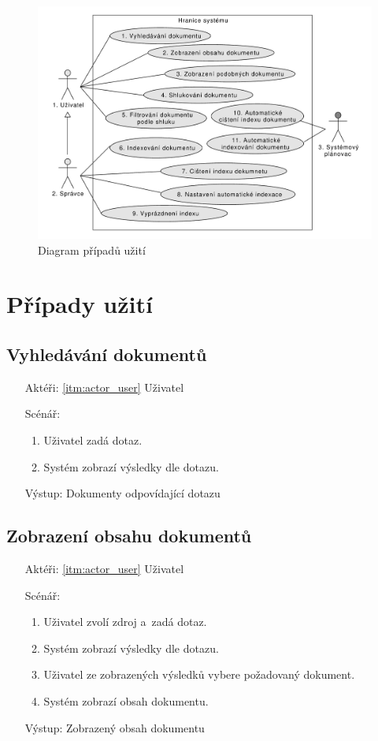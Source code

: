 \begin{figure}[h]
\begin{center}
\includegraphics[width=13cm]{UseCases}
\caption{Diagram případů užití}
\label{fig:UseCases}
\end{center}
\end{figure}

\section{Případy užití}

\subsection{Vyhledávání dokumentů}
\begin{itemize}
	\item[Aktéři:] \ref{itm:actor_user} Uživatel
	\item[Scénář:]
	\begin{enumerate}
		\item Uživatel zadá dotaz.
		\item Systém zobrazí výsledky dle dotazu.
	\end{enumerate}
	\item[Výstup:] Dokumenty odpovídající dotazu
\end{itemize}

\subsection{Zobrazení obsahu dokumentů}
\begin{itemize}
	\item[Aktéři:] \ref{itm:actor_user} Uživatel
	\item[Scénář:]
	\begin{enumerate}
		\item Uživatel zvolí zdroj a~zadá dotaz.
		\item Systém zobrazí výsledky dle dotazu.
		\item Uživatel ze zobrazených výsledků vybere požadovaný dokument.
		\item Systém zobrazí obsah dokumentu.
	\end{enumerate}
	\item[Výstup:] Zobrazený obsah dokumentu
\end{itemize}

